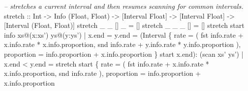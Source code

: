 \documentclass[]{article}
\newenvironment{Shaded}{}{}
\newcommand{\CommentTok}[1]{\textcolor[rgb]{0.38,0.63,0.69}{\textit{#1}}}
\newcommand{\DataTypeTok}[1]{\textcolor[rgb]{0.56,0.13,0.00}{#1}}
\newcommand{\FunctionTok}[1]{\textcolor[rgb]{0.02,0.16,0.49}{#1}}
\newcommand{\NormalTok}[1]{#1}
\newcommand{\OperatorTok}[1]{\textcolor[rgb]{0.40,0.40,0.40}{#1}}
\newcommand{\OtherTok}[1]{\textcolor[rgb]{0.00,0.44,0.13}{#1}}
\begin{document}
\begin{Shaded}
\begin{Highlighting}[]
\CommentTok{-- stretches a current interval and then resumes scanning for common intervals.}
\OtherTok{stretch ::} \DataTypeTok{Int} \OtherTok{->} \DataTypeTok{Info}\NormalTok{ (}\DataTypeTok{Float}\NormalTok{, }\DataTypeTok{Float}\NormalTok{) }\OtherTok{->}\NormalTok{ [}\DataTypeTok{Interval} \DataTypeTok{Float}\NormalTok{] }\OtherTok{->}\NormalTok{ [}\DataTypeTok{Interval} \DataTypeTok{Float}\NormalTok{] }\OtherTok{->}\NormalTok{ [}\DataTypeTok{Interval}\NormalTok{ (}\DataTypeTok{Float}\NormalTok{, }\DataTypeTok{Float}\NormalTok{)]}
\NormalTok{stretch _ _ [] _ }\OtherTok{=}\NormalTok{ []}
\NormalTok{stretch _ _ _ [] }\OtherTok{=}\NormalTok{ []}
\NormalTok{stretch start info xs}\OperatorTok{@}\NormalTok{(x}\OperatorTok{:}\NormalTok{xs') ys}\OperatorTok{@}\NormalTok{(y}\OperatorTok{:}\NormalTok{ys')}
  \OperatorTok{|}\NormalTok{ x}\OperatorTok{.}\NormalTok{end }\OtherTok{=}\NormalTok{ y}\OperatorTok{.}\NormalTok{end }\OtherTok{=}
\NormalTok{    (}\DataTypeTok{Interval}
\NormalTok{      \{}
\NormalTok{        rate }\OtherTok{=}\NormalTok{ (}
          \FunctionTok{fst}\NormalTok{ info}\OperatorTok{.}\NormalTok{rate }\OperatorTok{+}\NormalTok{ x}\OperatorTok{.}\NormalTok{info}\OperatorTok{.}\NormalTok{rate }\OperatorTok{*}\NormalTok{ x}\OperatorTok{.}\NormalTok{info}\OperatorTok{.}\NormalTok{proportion,}
          \FunctionTok{snd}\NormalTok{ info}\OperatorTok{.}\NormalTok{rate }\OperatorTok{+}\NormalTok{ y}\OperatorTok{.}\NormalTok{info}\OperatorTok{.}\NormalTok{rate }\OperatorTok{*}\NormalTok{ y}\OperatorTok{.}\NormalTok{info}\OperatorTok{.}\NormalTok{proportion}
\NormalTok{        ),}
\NormalTok{        proportion }\OtherTok{=}\NormalTok{ info}\OperatorTok{.}\NormalTok{proportion }\OperatorTok{+}\NormalTok{ x}\OperatorTok{.}\NormalTok{info}\OperatorTok{.}\NormalTok{proportion}
\NormalTok{      \}}
\NormalTok{      start x}\OperatorTok{.}\NormalTok{end)}\OperatorTok{:}
\NormalTok{    (scan xs' ys')}
  \OperatorTok{|}\NormalTok{ x}\OperatorTok{.}\NormalTok{end }\OperatorTok{<}\NormalTok{ y}\OperatorTok{.}\NormalTok{end }\OtherTok{=}\NormalTok{ stretch start}
\NormalTok{    \{}
\NormalTok{      rate }\OtherTok{=}\NormalTok{ (}
        \FunctionTok{fst}\NormalTok{ info}\OperatorTok{.}\NormalTok{rate }\OperatorTok{+}\NormalTok{ x}\OperatorTok{.}\NormalTok{info}\OperatorTok{.}\NormalTok{rate }\OperatorTok{*}\NormalTok{ x}\OperatorTok{.}\NormalTok{info}\OperatorTok{.}\NormalTok{proportion,}
        \FunctionTok{snd}\NormalTok{ info}\OperatorTok{.}\NormalTok{rate}
\NormalTok{      ),}
\NormalTok{      proportion }\OtherTok{=}\NormalTok{ info}\OperatorTok{.}\NormalTok{proportion }\OperatorTok{+}\NormalTok{ x}\OperatorTok{.}\NormalTok{info}\OperatorTok{.}\NormalTok{proportion}

\end{Highlighting}
\end{Shaded}
\end{document}
